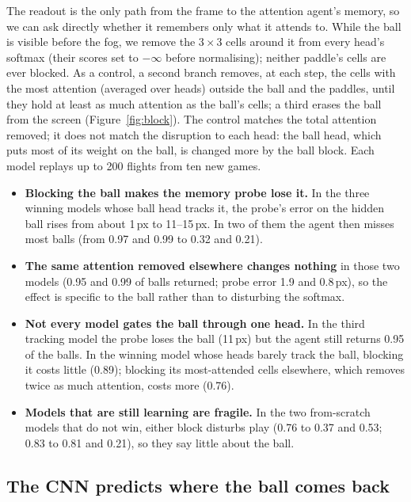 \documentclass[11pt]{article}
\begin{document}
The readout is the only path from the frame to the attention agent's memory, so we can ask directly whether
it remembers only what it attends to. While the ball is visible before the fog, we remove the $3\times3$ cells
around it from every head's softmax (their scores set to $-\infty$ before normalising); neither paddle's
cells are ever blocked. As a control, a second branch removes, at each step, the cells with the most
attention (averaged over heads) outside the ball and the paddles, until they hold at least as much attention
as the ball's cells; a third erases the ball from the screen (Figure~\ref{fig:block}). The control matches
the total attention removed; it does not match the disruption to each head: the ball head, which puts most of its weight on
the ball, is changed more by the ball block. Each model replays up to 200 flights from ten new games.
\begin{itemize}
  \item \textbf{Blocking the ball makes the memory probe lose it.} In the three winning models whose ball
    head tracks it, the probe's error on the hidden ball rises from about 1\,px to 11--15\,px. In two of them
    the agent then misses most balls (from 0.97 and 0.99 to 0.32 and 0.21).
  \item \textbf{The same attention removed elsewhere changes nothing} in those two models (0.95 and 0.99 of
    balls returned; probe error 1.9 and 0.8\,px), so the effect is specific to the ball rather than to disturbing the
    softmax.
  \item \textbf{Not every model gates the ball through one head.} In the third tracking model the probe
    loses the ball (11\,px) but the agent still returns 0.95 of the balls. In the winning model whose heads
    barely track the ball, blocking it costs little (0.89); blocking its most-attended cells elsewhere,
    which removes twice as much attention, costs more (0.76).
  \item \textbf{Models that are still learning are fragile.} In the two from-scratch models that do not
    win, either block disturbs play (0.76 to 0.37 and 0.53; 0.83 to 0.81 and 0.21), so they say little
    about the ball.
\end{itemize}

\subsection{The CNN predicts where the ball comes back}
\label{sec:cnn}
\end{document}
